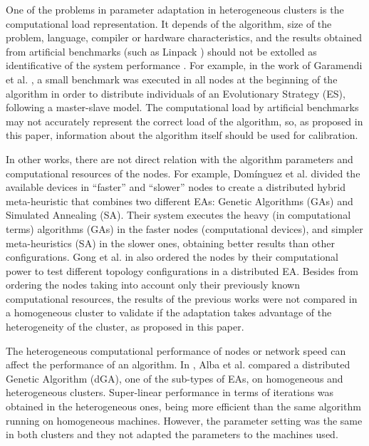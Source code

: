 \documentclass[final,1p,times]{elsarticle}
\begin{document}
One of the problems in parameter adaptation in heterogeneous clusters is 
the computational load representation. It depends of the algorithm, size of the problem, 
language, compiler or hardware characteristics, and the results obtained from artificial 
benchmarks (such as  Linpack \cite{LinpackEndo10}) should not be extolled as identificative 
of the system performance \cite{LinpackDongarra03}. For example, in the work of Garamendi 
et al. \cite{PARALLELIMPLEMENTATION},  a small benchmark was executed in all nodes at the beginning
of the algorithm in order to distribute individuals of an Evolutionary Strategy
 (ES), following a master-slave model. The computational load by artificial benchmarks may not accurately 
 represent the correct load of the algorithm, so, as proposed in this paper, information 
 about the algorithm itself should be used for calibration.

In other works, there are not direct relation with the algorithm parameters and 
computational resources of the nodes. For example, Dom\'inguez et al. \cite{HYDROCM} 
divided the available devices in ``faster'' and ``slower'' nodes to create a distributed hybrid 
meta-heuristic that combines two different EAs: Genetic Algorithms (GAs) and Simulated
Annealing (SA). Their system executes the heavy (in computational
terms) algorithms (GAs) in the faster nodes (computational devices), and
simpler meta-heuristics (SA) in the slower ones, obtaining better results
than other configurations.  Gong et al. in \cite{HETEROGENEOUSTOPOLOGY} also ordered 
the nodes by their computational power to test different topology configurations in a distributed EA.
Besides from ordering the nodes taking into account 
only their previously known computational resources, the results of the previous works were not compared in a homogeneous 
cluster to validate if the adaptation takes advantage of the heterogeneity 
of the cluster, as proposed in this paper.

The heterogeneous computational performance of nodes or network speed can affect the performance of an algorithm. In \cite{HETEROGENEOUSHARD},
 Alba et al. compared a distributed Genetic Algorithm (dGA), one of
 the sub-types of EAs, on homogeneous and heterogeneous clusters. %
 Super-linear performance in terms of iterations was obtained in the heterogeneous ones,
 being more efficient than the same algorithm running on homogeneous
 machines. However, the parameter setting was the same in both
 clusters and they not adapted the parameters to the machines used. %
\end{document}
